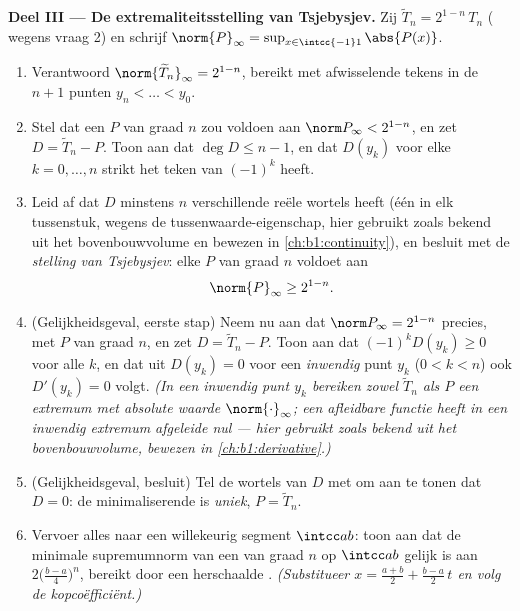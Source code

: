 \begin{problem}
\medskip
\noindent\textbf{Deel III --- De extremaliteitsstelling van Tsjebysjev.}
Zij $\widetilde T_n = 2^{1-n}\,T_n$ ( wegens vraag 2) en schrijf
$\norm{P}_\infty = \sup_{x \in \intcc{-1}1}\abs{P(x)}$.
\begin{enumerate}[resume]
  \item Verantwoord $\norm{\widetilde T_n}_\infty = 2^{1-n}$, bereikt
        met afwisselende tekens in de $n + 1$ punten $y_n < \dots <
        y_0$.
  \item Stel dat een  $P$ van graad $n$ zou voldoen aan $\norm
        P_\infty < 2^{1-n}$, en zet $D = \widetilde T_n - P$. Toon aan
        dat $\deg D \leq n - 1$, en dat $D(y_k)$ voor elke $k = 0,
        \dots, n$ strikt het teken van $(-1)^k$ heeft.
  \item Leid af dat $D$ minstens $n$ verschillende reële wortels heeft
        (één in elk tussenstuk, wegens de tussenwaarde-eigenschap, hier
        gebruikt zoals bekend uit het bovenbouwvolume en bewezen in
        \cref{ch:b1:continuity}), en besluit met de \emph{stelling van
        Tsjebysjev}: elke  $P$ van graad $n$ voldoet aan
        \[
        \norm{P}_\infty \geq 2^{1-n} .
        \]
  \item (Gelijkheidsgeval, eerste stap) Neem nu aan dat $\norm P_\infty
        = 2^{1-n}$ precies, met $P$  van graad $n$, en zet $D =
        \widetilde T_n - P$. Toon aan dat $(-1)^kD(y_k) \geq 0$ voor
        alle $k$, en dat uit $D(y_k) = 0$ voor een \emph{inwendig} punt
        $y_k$ ($0 < k < n$) ook $D'(y_k) = 0$ volgt. \emph{(In een
        inwendig punt $y_k$ bereiken zowel $\widetilde T_n$ als $P$ een
        extremum met absolute waarde $\norm{\cdot}_\infty$; een
        afleidbare functie heeft in een inwendig extremum afgeleide nul
        --- hier gebruikt zoals bekend uit het bovenbouwvolume, bewezen
        in \cref{ch:b1:derivative}.)}
  \item (Gelijkheidsgeval, besluit) Tel de wortels van $D$ met
         om aan te tonen dat $D = 0$: de minimaliserende
         is \emph{uniek}, $P = \widetilde T_n$.
  \item Vervoer alles naar een willekeurig segment $\intcc ab$: toon aan
        dat de minimale supremumnorm van een  van graad
        $n$ op $\intcc ab$ gelijk is aan $2\bigl(\frac{b-a}4\bigr)^n$,
        bereikt door een herschaalde .
        \emph{(Substitueer $x = \frac{a+b}2 + \frac{b-a}2\,t$ en volg de
        kopcoëfficiënt.)}
\end{enumerate}


\end{problem}
